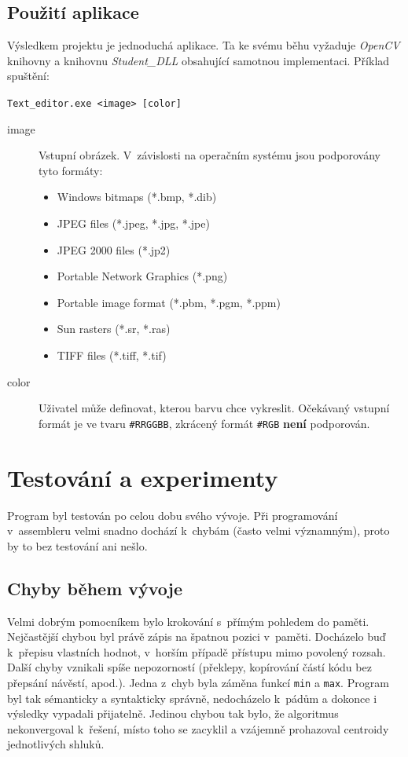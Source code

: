 \documentclass[11pt,a4paper,onecolumn,notitlepage]{article}
\begin{document}
	\subsection{Použití aplikace}
		Výsledkem projektu je jednoduchá aplikace. Ta ke svému běhu vyžaduje \emph{OpenCV} knihovny a knihovnu \emph{Student\_DLL} obsahující samotnou implementaci. Příklad spuštění:
		\begin{center}
			\texttt{Text\_editor.exe <image> [color]}
		\end{center}
		\begin{description}
			\item[image] Vstupní obrázek. V~závislosti na operačním systému jsou podporovány tyto formáty: \cite{OpenCV_Formats}
			\begin{itemize}
				\item Windows bitmaps (*.bmp, *.dib)
				\item JPEG files (*.jpeg, *.jpg, *.jpe)
				\item JPEG 2000 files (*.jp2)
				\item Portable Network Graphics (*.png)
				\item Portable image format (*.pbm, *.pgm, *.ppm)
				\item Sun rasters (*.sr, *.ras)
				\item TIFF files (*.tiff, *.tif)
			\end{itemize}
			\item[color] Uživatel může definovat, kterou barvu chce vykreslit. Očekávaný vstupní formát je ve tvaru \texttt{\#RRGGBB}, zkrácený formát \texttt{\#RGB} \textbf{není} podporován.
		\end{description}
	
	
\section{Testování a experimenty}
	Program byl testován po celou dobu svého vývoje. Při programování v~assembleru velmi snadno dochází k~chybám (často velmi významným), proto by to bez testování ani nešlo.
	
	\subsection{Chyby během vývoje}
		Velmi dobrým pomocníkem bylo krokování s~přímým pohledem do paměti. Nejčastější chybou byl právě zápis na špatnou pozici v~paměti. Docházelo buď k~přepisu vlastních hodnot, v~horším případě přístupu mimo povolený rozsah. Další chyby vznikali spíše nepozorností (překlepy, kopírování částí kódu bez přepsání návěstí, apod.). Jedna z~chyb byla záměna funkcí \texttt{min} a \texttt{max}. Program byl tak sémanticky a syntakticky správně, nedocházelo k~pádům a dokonce i výsledky vypadali přijatelně. Jedinou chybou tak bylo, že algoritmus nekonvergoval k~řešení, místo toho se zacyklil a vzájemně prohazoval centroidy jednotlivých shluků.
		
\end{document}
